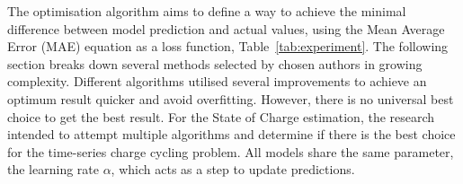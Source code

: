 The optimisation algorithm aims to define a way to achieve the minimal difference between model prediction and actual values, using the Mean Average Error (MAE) equation as a loss function, \mbox{Table~\ref{tab:experiment}}.
The following section breaks down several methods selected by chosen authors in growing complexity.
Different algorithms utilised several improvements to achieve an optimum result quicker and avoid overfitting.
However, there is no universal best choice to get the best result.
For the State of Charge estimation, the research intended to attempt multiple algorithms and determine if there is the best choice for the time-series charge cycling problem.
All models share the same parameter, the learning rate $\alpha$, which acts as a step to update predictions.

